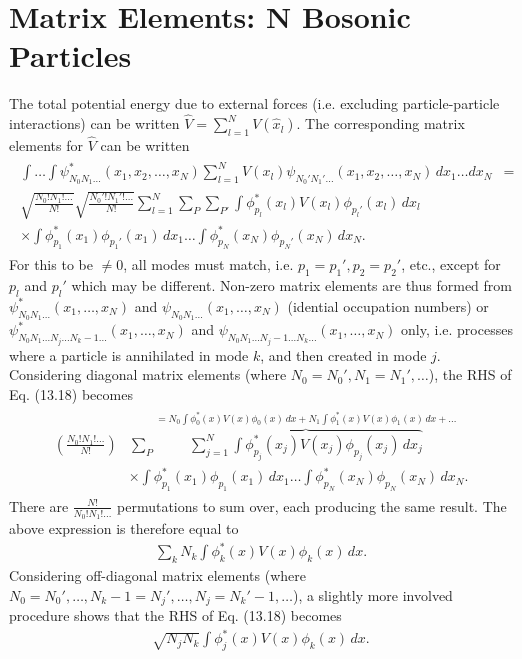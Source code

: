 \documentclass[qo.tex]{subfiles}
\begin{document}
\section{Matrix Elements: N Bosonic Particles}
The total potential energy due to external forces (i.e. excluding particle-particle interactions) can be written $\hat{V}=\sum_{l=1}^N V(\hat{x}_l)$.
The corresponding matrix elements for $\hat{V}$ can be written
\begin{align}
    \begin{split}
        \int\dots\int \psi^*_{N_0N_1\dots}(x_1,x_2,\dots,x_N)\sum_{l=1}^N V(x_l)\psi_{N_0'N_1'\dots}(x_1,x_2,\dots,x_N)\,dx_1\dots dx_N &= \\
        \sqrt{\frac{N_0!N_1!\dots}{N!}}\sqrt{\frac{N_0'!N_1'!\dots}{N!}}\sum_{l=1}^N\sum_P\sum_{P'} \int \phi_{p_l}^*(x_l)V(x_l)\phi_{p_l'}(x_l)\,dx_l& \\
        \times\int\phi_{p_1}^*(x_1)\phi_{p_1'}(x_1)\,dx_1\dots\int\phi_{p_N}^*(x_N)\phi_{p_N'}(x_N)\,dx_N.&
    \end{split}
\end{align}
For this to be $\neq0$, all modes must match, i.e. $p_1=p_1',p_2=p_2'$, etc., except for $p_l$ and $p_l'$ which may be different. 
Non-zero matrix elements are thus formed from $\psi^*_{N_0N_1\dots}(x_1,\dots,x_N)$ and $\psi_{N_0N_1\dots}(x_1,\dots,x_N)$ (idential occupation numbers) or $\psi^*_{N_0N_1\dots N_j\dots N_k-1\dots}(x_1,\dots,x_N)$ and $\psi_{N_0N_1\dots N_j-1\dots N_k\dots}(x_1,\dots,x_N)$ only, i.e. processes where a particle is annihilated in mode $k$, and then created in mode $j$.
Considering diagonal matrix elements (where $N_0=N_0',N_1=N_1',\dots$), the RHS of Eq. (13.18) becomes
\begin{align}
    \begin{split}
        \left(\frac{N_0!N_1!\dots}{N!}\right)& \sum_P \overbrace{\sum_{j=1}^N \int \phi_{p_j}^*(x_j)V(x_j)\phi_{p_j}(x_j)\,dx_j}^{=N_0\int\phi_0^*(x)V(x)\phi_0(x)\,dx + N_1\int\phi_1^*(x)V(x)\phi_1(x)\,dx + \dots} \\
                                             &\times \int \phi_{p_1}^*(x_1)\phi_{p_1}(x_1)\,dx_1\dots\int \phi_{p_N}^*(x_N)\phi_{p_N}(x_N)\,dx_N.
    \end{split}
\end{align}
There are $\frac{N!}{N_0!N_1!\dots}$ permutations to sum over, each producing the same result. 
The above expression is therefore equal to
\begin{align}
    \sum_k N_k \int \phi_k^*(x)V(x)\phi_k(x)\,dx.
\end{align}
Considering off-diagonal matrix elements (where $N_0=N_0',\dots,N_k-1=N_j',\dots,N_j=N_k'-1,\dots$), a slightly more involved procedure shows that the RHS of Eq. (13.18) becomes
\begin{align}
    \sqrt{N_jN_k}\int \phi_j^*(x)V(x)\phi_k(x)\,dx.
\end{align} 
\end{document}
